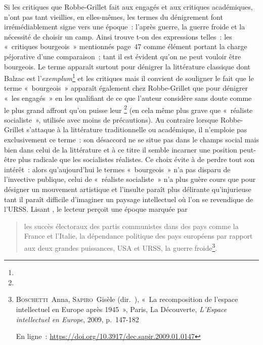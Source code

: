 \documentclass[12pt, a4paper]{article}
\begin{document}
Si les critiques que Robbe-Grillet fait aux engagés et aux critiques académiques, n'ont pas tant vieillies, en elles-mêmes, les termes du dénigrement font irrémédiablement signe vers une époque~: l'après guerre, la guerre froide et la nécessité de choisir un camp. Ainsi trouve t-on des expressions telles~: les «~critiques bourgeois~» mentionnés page~47 comme élément portant la charge péjorative d'une comparaison~; tant il est évident qu'on ne peut vouloir être bourgeois. Le terme apparaît surtout pour dénigrer la littérature classique dont Balzac est l'\textit{exemplum}\footnote{} et les critiques mais il convient de souligner le fait que le terme «~bourgeois~» apparaît également chez Robbe-Grillet que pour dénigrer «~les engagés~» en les qualifiant de ce que l'auteur considère sans doute comme le plus grand affront qu'on puisse leur \footnote{} (en cela même plus grave que «~réaliste socialiste~», utilisée avec moins de précautions). Au contraire lorsque Robbe-Grillet s'attaque à la littérature traditionnelle ou académique, il n'emploie pas exclusivement ce terme~: son désaccord ne se situe pas dans le champs social mais bien dans celui de la littérature et à ce titre il semble incarner une position peut-être plus radicale que les socialistes réalistes. Ce choix évite à \punr{} de perdre tout son intérêt~: alors qu'aujourd'hui le termes «~bourgeois~» n'a pas disparu de l'invective publique, celui de «~réaliste socialiste~» n'a plus guère cours que pour désigner un mouvement artistique et l'insulte paraît plus délirante qu'injurieuse tant il paraît difficile d'imaginer un paysage intellectuel où l'on se revendique de l'URSS. Lisant \punr, le lecteur perçoit une époque marquée par
\begin{quote}
    les succès électoraux des partis communistes dans des pays comme la France et l’Italie, la dépendance politique des pays européens par rapport aux deux grandes puissances, USA et URSS, la guerre froide\footnote{\textsc{Boschetti}~Anna, \textsc{Sapiro}~Gisèle (dir.~), «~La recomposition de l'espace intellectuel en Europe après 1945~», Paris, La Découverte, \textit{L'Espace intellectuel en Europe}, 2009, p.~147-182

En ligne~: \href{https://doi.org/10.3917/dec.sapir.2009.01.0147}{https://doi.org/10.3917/dec.sapir.2009.01.0147}}.
\end{quote}

\end{document}
